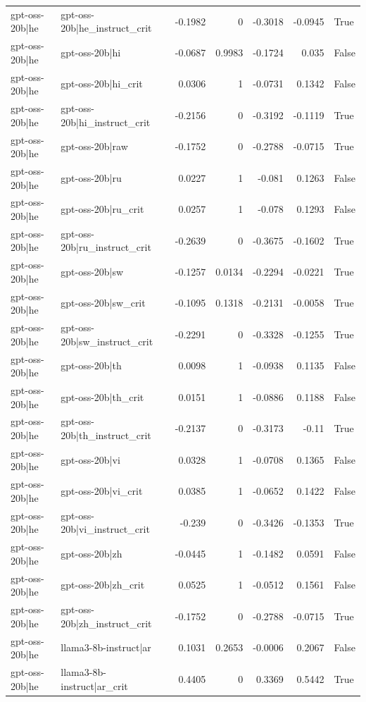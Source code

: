 \begin{table}
\begin{tabular}{l l r r r r l}
gpt-oss-20b|he & gpt-oss-20b|he_instruct_crit & -0.1982 & 0 & -0.3018 & -0.0945 & True \\
gpt-oss-20b|he & gpt-oss-20b|hi & -0.0687 & 0.9983 & -0.1724 & 0.035 & False \\
gpt-oss-20b|he & gpt-oss-20b|hi_crit & 0.0306 & 1 & -0.0731 & 0.1342 & False \\
gpt-oss-20b|he & gpt-oss-20b|hi_instruct_crit & -0.2156 & 0 & -0.3192 & -0.1119 & True \\
gpt-oss-20b|he & gpt-oss-20b|raw & -0.1752 & 0 & -0.2788 & -0.0715 & True \\
gpt-oss-20b|he & gpt-oss-20b|ru & 0.0227 & 1 & -0.081 & 0.1263 & False \\
gpt-oss-20b|he & gpt-oss-20b|ru_crit & 0.0257 & 1 & -0.078 & 0.1293 & False \\
gpt-oss-20b|he & gpt-oss-20b|ru_instruct_crit & -0.2639 & 0 & -0.3675 & -0.1602 & True \\
gpt-oss-20b|he & gpt-oss-20b|sw & -0.1257 & 0.0134 & -0.2294 & -0.0221 & True \\
gpt-oss-20b|he & gpt-oss-20b|sw_crit & -0.1095 & 0.1318 & -0.2131 & -0.0058 & True \\
gpt-oss-20b|he & gpt-oss-20b|sw_instruct_crit & -0.2291 & 0 & -0.3328 & -0.1255 & True \\
gpt-oss-20b|he & gpt-oss-20b|th & 0.0098 & 1 & -0.0938 & 0.1135 & False \\
gpt-oss-20b|he & gpt-oss-20b|th_crit & 0.0151 & 1 & -0.0886 & 0.1188 & False \\
gpt-oss-20b|he & gpt-oss-20b|th_instruct_crit & -0.2137 & 0 & -0.3173 & -0.11 & True \\
gpt-oss-20b|he & gpt-oss-20b|vi & 0.0328 & 1 & -0.0708 & 0.1365 & False \\
gpt-oss-20b|he & gpt-oss-20b|vi_crit & 0.0385 & 1 & -0.0652 & 0.1422 & False \\
gpt-oss-20b|he & gpt-oss-20b|vi_instruct_crit & -0.239 & 0 & -0.3426 & -0.1353 & True \\
gpt-oss-20b|he & gpt-oss-20b|zh & -0.0445 & 1 & -0.1482 & 0.0591 & False \\
gpt-oss-20b|he & gpt-oss-20b|zh_crit & 0.0525 & 1 & -0.0512 & 0.1561 & False \\
gpt-oss-20b|he & gpt-oss-20b|zh_instruct_crit & -0.1752 & 0 & -0.2788 & -0.0715 & True \\
gpt-oss-20b|he & llama3-8b-instruct|ar & 0.1031 & 0.2653 & -0.0006 & 0.2067 & False \\
gpt-oss-20b|he & llama3-8b-instruct|ar_crit & 0.4405 & 0 & 0.3369 & 0.5442 & True \\

\end{tabular}
\end{table}
